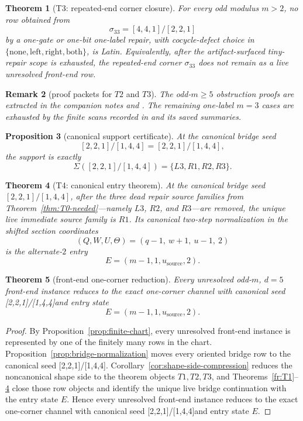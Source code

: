 \documentclass[11pt]{article}
\newtheorem{theorem}{Theorem}[section]
\newtheorem{proposition}[theorem]{Proposition}
\newtheorem{remark}[theorem]{Remark}
\newcommand{\sig}[2]{\sigma_{#1#2}}
\newcommand{\CanL}{[2,2,1]}
\newcommand{\CanR}{[1,4,4]}
\newcommand{\CanSeed}{\CanL/\CanR}
\begin{document}
\begin{theorem}[T3: repeated-end corner closure]
\label{fr:T3}\label{thm:T3-closed}
For every odd modulus \(m>2\), no row obtained from
\[
\sig33=[4,4,1]/[2,2,1]
\]
by a one-gate or one-bit one-label repair, with cocycle-defect choice in
\(\{\mathrm{none},\mathrm{left},\mathrm{right},\mathrm{both}\}\), is Latin.
Equivalently, after the artifact-surfaced tiny-repair scope is exhausted, the
repeated-end corner \(\sig33\) does not remain as a live unresolved front-end row.
\end{theorem}

\begin{remark}[proof packets for \(T2\) and \(T3\)]
The odd-\(m\ge 5\) obstruction proofs are extracted in the companion notes
 and
.
The remaining one-label \(m=3\) cases are exhausted by the finite scans recorded
in  and its saved summaries.
\end{remark}

\begin{proposition}[canonical support certificate]
\label{prop:canonical-support}
At the canonical bridge seed
\[
\CanSeed=\CanL/\CanR,
\]
the support is exactly
\[
\Sigma(\CanSeed)=\{L3,R1,R2,R3\}.
\]
\end{proposition}

\begin{theorem}[T4: canonical entry theorem]
\label{fr:T4}
At the canonical bridge seed \(\CanSeed\), after the three dead repair source
families from Theorem~\ref{thm:T0-needed}---namely \(L3\), \(R2\), and
\(R3\)---are removed, the unique live immediate source family is \(R1\).
Its canonical two-step normalization in the shifted section coordinates
\[
(Q,W,U,\Theta)=(q-1,\ w+1,\ u-1,\ 2)
\]
is the alternate-$2$ entry
\[
E=(m-1,1,u_{\mathrm{source}},2).
\]
\end{theorem}

\begin{theorem}[front-end one-corner reduction]
\label{thm:conditional-front-end}
Every unresolved odd-$m$, $d=5$ front-end instance reduces to the exact
one-corner channel with canonical seed \CanSeed and entry state
\[
E=(m-1,1,u_{\mathrm{source}},2).
\]
\end{theorem}

\begin{proof}
By Proposition~\ref{prop:finite-chart}, every unresolved front-end instance is
represented by one of the finitely many rows in the chart.
Proposition~\ref{prop:bridge-normalization} moves every oriented bridge row to
the canonical seed \CanSeed.  Corollary~\ref{cor:shape-side-compression}
reduces the noncanonical shape side to the theorem objects \(T1,T2,T3\),
and Theorems~\ref{fr:T1}--\ref{fr:T4} close those row objects and identify
the unique live bridge continuation with the entry state \(E\).  Hence every
unresolved front-end instance reduces to the exact one-corner channel with
canonical seed \CanSeed and entry state \(E\).
\end{proof}
\end{document}

